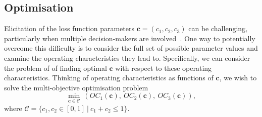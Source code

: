 \documentclass{article} %
\begin{document}
%

\subsection{Optimisation}\label{sec:optimisation}

Elicitation of the loss function parameters $\mathbf{c} = (c_1, c_2, c_3)$ can be challenging, particularly when multiple decision-makers are involved~\cite{Keeney1976}. One way to potentially overcome this difficulty is to consider the full set of possible parameter values and examine the operating characteristics they lead to. Specifically, we can consider the problem of of finding optimal $\mathbf{c}$ with respect to these operating characteristics. Thinking of operating characteristics as functions of $\mathbf{c}$, we wish to solve the multi-objective optimisation problem
\begin{equation}\label{eqn:opt}
\min_{\mathbf{c} \in \mathcal{C}} ~ \left( OC_{1}(\mathbf{c}),~ OC_{2}(\mathbf{c}),~ OC_{3}(\mathbf{c}) \right),
\end{equation}
where $\mathcal{C} = \{c_{1}, c_{2} \in [0,1] ~|~ c_{1} + c_{2} \leq 1\}$. 
\end{document}
